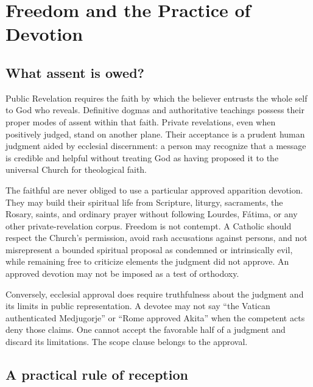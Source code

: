 \section{Freedom and the Practice of Devotion}

\subsection{What assent is owed?}

Public Revelation requires the faith by which the believer entrusts the whole self to God who reveals. Definitive dogmas and authoritative teachings possess their proper modes of assent within that faith. Private revelations, even when positively judged, stand on another plane. Their acceptance is a prudent human judgment aided by ecclesial discernment: a person may recognize that a message is credible and helpful without treating God as having proposed it to the universal Church for theological faith.

The faithful are never obliged to use a particular approved apparition devotion. They may build their spiritual life from Scripture, liturgy, sacraments, the Rosary, saints, and ordinary prayer without following Lourdes, Fátima, or any other private-revelation corpus. Freedom is not contempt. A Catholic should respect the Church's permission, avoid rash accusations against persons, and not misrepresent a bounded spiritual proposal as condemned or intrinsically evil, while remaining free to criticize elements the judgment did not approve. An approved devotion may not be imposed as a test of orthodoxy.

Conversely, ecclesial approval does require truthfulness about the judgment and its limits in public representation. A devotee may not say ``the Vatican authenticated Medjugorje'' or ``Rome approved Akita'' when the competent acts deny those claims. One cannot accept the favorable half of a judgment and discard its limitations. The scope clause belongs to the approval.

\subsection{A practical rule of reception}

